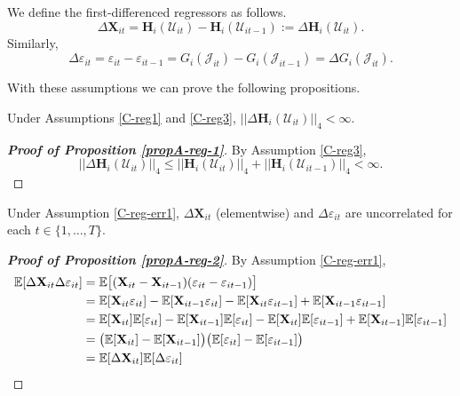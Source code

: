 \documentclass[a4paper,12pt]{article}
\begin{document}
We define the first-differenced regressors as follows.
\[ \Delta \mathbf{X}_{it} =\mathbf{H}_i(\mathcal{U}_{it}) - \mathbf{H}_i(\mathcal{U}_{it-1}) := \Delta \mathbf{H}_i(\mathcal{U}_{it}). \]
Similarly, 
\[\Delta \varepsilon_{it} = \varepsilon_{it} - \varepsilon_{it-1} = G_i(\mathcal{J}_{it}) - G_i(\mathcal{J}_{it-1}) = \Delta G_i(\mathcal{J}_{it}).
\]
 
With these assumptions we can prove the following propositions.
\begin{propA}\label{propA-reg-1}
Under Assumptions \ref{C-reg1} and \ref{C-reg3}, $|| \Delta \mathbf{H}_i(\mathcal{U}_{it})||_4 < \infty$.
\end{propA}

\begin{proof}[\textnormal{\textbf{Proof of Proposition \ref{propA-reg-1}}}]
By Assumption \ref{C-reg3},
\[
 || \Delta \mathbf{H}_i(\mathcal{U}_{it})||_4 \leq  ||\mathbf{H}_i(\mathcal{U}_{it})||_4 +  || \mathbf{H}_i(\mathcal{U}_{it-1})||_4 < \infty.
\]
\end{proof} 

\begin{propA}\label{propA-reg-2}
Under Assumption \ref{C-reg-err1}, $\Delta \mathbf{X}_{it}$ (elementwise) and $\Delta \varepsilon_{it}$ are uncorrelated for each $t\in \{1, \ldots, T\}$.
\end{propA}

\begin{proof}[\textnormal{\textbf{Proof of Proposition \ref{propA-reg-2}}}]
By Assumption \ref{C-reg-err1},
\begin{align*}
\mathbb{E} [\Delta \mathbf{X}_{it}\Delta \varepsilon_{it}] &= \mathbb{E} \big[(\mathbf{X}_{it} - \mathbf{X}_{it-1}) (\varepsilon_{it} - \varepsilon_{it-1})\big] \\
&=\mathbb{E}[\mathbf{X}_{it}  \varepsilon_{it}] - \mathbb{E}[\mathbf{X}_{it-1}  \varepsilon_{it}]- \mathbb{E}[\mathbf{X}_{it}  \varepsilon_{it-1}] + \mathbb{E}[\mathbf{X}_{it-1}  \varepsilon_{it-1}] \\
&= \mathbb{E}[\mathbf{X}_{it}]\mathbb{E}[  \varepsilon_{it}] - \mathbb{E}[\mathbf{X}_{it-1}]\mathbb{E}[  \varepsilon_{it}]- \mathbb{E}[\mathbf{X}_{it}]\mathbb{E}[  \varepsilon_{it-1}] + \mathbb{E}[\mathbf{X}_{it-1}]\mathbb{E}[  \varepsilon_{it-1}] \\
&= \big( \mathbb{E}[\mathbf{X}_{it}] - \mathbb{E}[\mathbf{X}_{it-1}]\big)\big(\mathbb{E}[  \varepsilon_{it}]  - \mathbb{E}[\varepsilon_{it-1}]\big) \\
&= \mathbb{E} [\Delta \mathbf{X}_{it}]\mathbb{E}[\Delta \varepsilon_{it}]
\end{align*}
\end{proof} 
\end{document}
